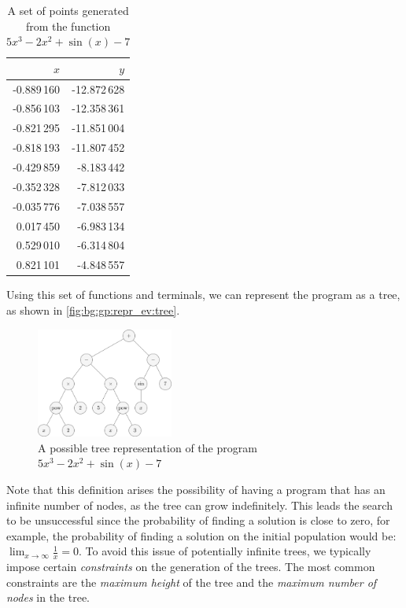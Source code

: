  \begin{table}[ht!]
    \centering
    \begin{tabular}{|r|r|}
      \hline
      \(x\) & \(y\) \\
      \hline
      \hline
      -0.889\,160    & -12.872\,628 \\
      \hline
      -0.856\,103   & -12.358\,361 \\
      \hline
      -0.821\,295   & -11.851\,004 \\
      \hline
      -0.818\,193   & -11.807\,452 \\
      \hline
      -0.429\,859   & -8.183\,442  \\
      \hline
      -0.352\,328   & -7.812\,033  \\
      \hline
      -0.035\,776   & -7.038\,557  \\
      \hline
      0.017\,450  & -6.983\,134  \\
      \hline
      0.529\,010    & -6.314\,804 \\
      \hline
      0.821\,101    & -4.848\,557  \\
      \hline
    \end{tabular}
    \caption{
      A set of points generated from the function \(5x^3 - 2x^2 + \sin(x) - 7\)
    }
    \label{tab:bg:gp:repr_ev:points}
  \end{table}

  Using this set of functions and terminals, we can represent the program as a
  tree, as shown in \vref{fig:bg:gp:repr_ev:tree}.

  \begin{figure}[ht!]
    \centering
    \includegraphics[width=0.4\textwidth]{img/theoretical_framework/Expected Expression Tree.png}
    \caption{
      A possible tree representation of the program \(5x^3 - 2x^2 + \sin(x) - 7\)
    }
    \label{fig:bg:gp:repr_ev:tree}
  \end{figure}

  Note that this definition arises the possibility of having a program that
  has an infinite number of nodes, as the tree can grow indefinitely.
  This leads the search to be unsuccessful since the probability of finding a
  solution is close to zero, for example, the probability of finding a solution
  on the initial population would be: \(\lim_{x \to \infty} \frac{1}{x} = 0\).
  To avoid this issue of potentially infinite trees, we typically impose certain
  \emph{constraints} on the generation of the trees.
  The most common constraints are the \emph{maximum height} of the tree and the
  \emph{maximum number of nodes} in the tree.
